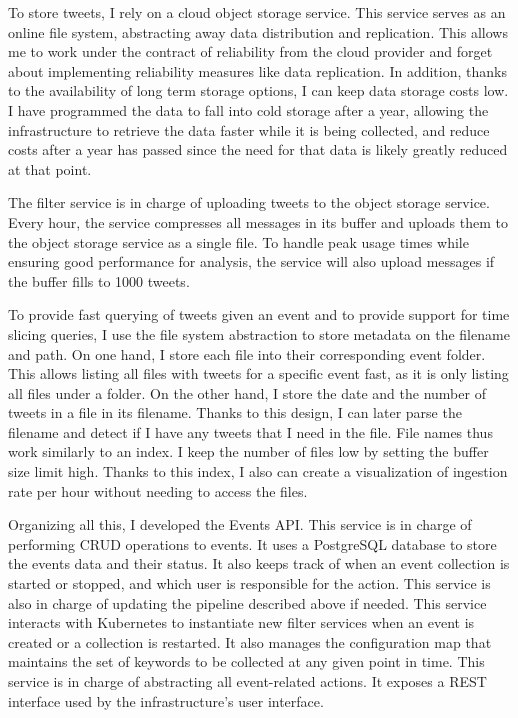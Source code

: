 To store tweets, I rely on a cloud object storage service. This service serves as an online file system, abstracting away data distribution and replication. This allows me to work under the contract of reliability from the cloud provider and forget about implementing reliability measures like data replication. In addition, thanks to the availability of long term storage options, I can keep data storage costs low. I have programmed the data to fall into cold storage after a year, allowing the infrastructure to retrieve the data faster while it is being collected, and reduce costs after a year has passed since the need for that data is likely greatly reduced at that point.

The filter service is in charge of uploading tweets to the object storage service. Every hour, the service compresses all messages in its buffer and uploads them to the object storage service as a single file. To handle peak usage times while ensuring good performance for analysis, the service will also upload messages if the buffer fills to 1000 tweets. 

To provide fast querying of tweets given an event and to provide support for time slicing queries, I use the file system abstraction to store  metadata on the filename and path. On one hand, I store each file into their corresponding event folder. This allows listing all files with tweets for a specific event fast, as it is only listing all files under a folder. On the other hand, I store the date and the number of tweets in a file in its filename. Thanks to this design, I can later parse the filename and detect if I have any tweets that I need in the file. File names thus work similarly to an index. I keep the number of files low by setting the buffer size limit high. Thanks to this index, I also can create a visualization of ingestion rate per hour without needing to access the files. 

Organizing all this, I developed the Events API. This service is in charge of performing CRUD operations to events. It uses a PostgreSQL database to store the events data and their status. It also keeps track of when an event collection is started or stopped, and which user is responsible for the action. This service is also in charge of updating the pipeline described above if needed. This service interacts with Kubernetes to instantiate new filter services when an event is created or a collection is restarted. It also manages the configuration map that maintains the set of keywords to be collected at any given point in time. This service is in charge of abstracting all event-related actions. It exposes a REST interface used by the infrastructure's user interface.

